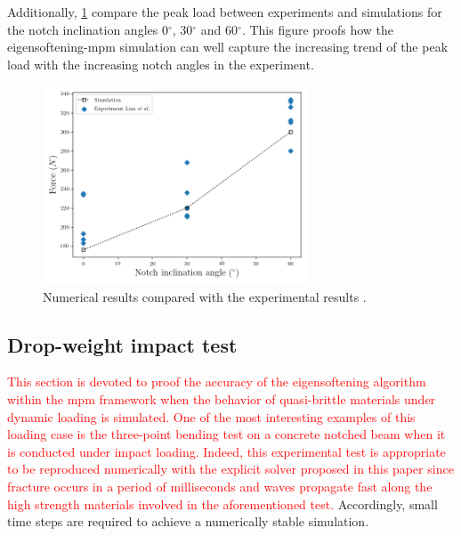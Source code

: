 \message{ !name(2020_EFM_MPM_Eigensoftening.tex)}\documentclass[preprint,12pt,a4paper]{elsarticle}
\newcommand{\PNA}[1]{
  \textcolor{red}{{#1}}
}
\begin{document}
Additionally, \ref{fig:plot-Angle-Forces-test} compare the peak load
between experiments and simulations for the notch inclination angles
0$^{\circ}$, 30$^{\circ}$ and 60$^{\circ}$. This figure proofs how the
eigensoftening-\acrshort{mpm} simulation can well capture the
increasing trend of the peak load with the increasing notch angles in
the experiment.
\begin{figure}
  \centering
  \includegraphics[width=0.7\textwidth]{./Figure-Angle-Forces-test}
  \caption{Numerical results compared with the experimental results \cite{LIM_1993}.}
  \label{fig:plot-Angle-Forces-test}
\end{figure}



\subsection{Drop-weight impact test}
\label{sec:3.3}
\PNA{This section is devoted to proof
the accuracy of the eigensoftening algorithm within the \acrshort{mpm} framework when the behavior
of quasi-brittle materials under dynamic loading is simulated. One of the most interesting examples of this
loading case is the three-point bending test on a concrete notched beam when it is conducted under impact loading. Indeed, this experimental test is appropriate to be reproduced numerically with the explicit solver proposed in this paper since
fracture occurs in a period of milliseconds and waves propagate fast along the high strength
materials involved in the aforementioned test.} Accordingly, small time steps are
required to achieve a numerically stable simulation.\\
\end{document}
